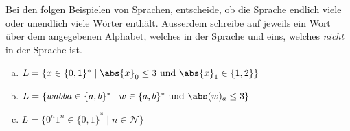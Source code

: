 %
%
Bei den folgen Beispielen von Sprachen, entscheide, ob die Sprache endlich viele oder unendlich viele Wörter enthält. Ausserdem schreibe auf jeweils ein Wort über dem angegebenen Alphabet, welches in der Sprache und eins, welches \emph{nicht} in der Sprache ist.

{
\begin{enumerate}[(a)]
    \item \(L = \{x \in \{0,1\}^* \mid \abs{x}_0 \leq 3 \text{ und } \abs{x}_1 \in \{1,2\}\}\) \\
    \blank[width=\linewidth]{}

    \item \(L = \{wabba \in \{a,b\}^* \mid w \in \{a, b\}^* \text{ und } \abs(w)_a \leq 3\}\) \\
    \blank[width=\linewidth]{}

    \item \(L = \{0^n 1^n \in \{0, 1\}^* \mid n \in \mathcal{N}\}\) \\
    \blank[width=\linewidth]{}
\end{enumerate}
}
